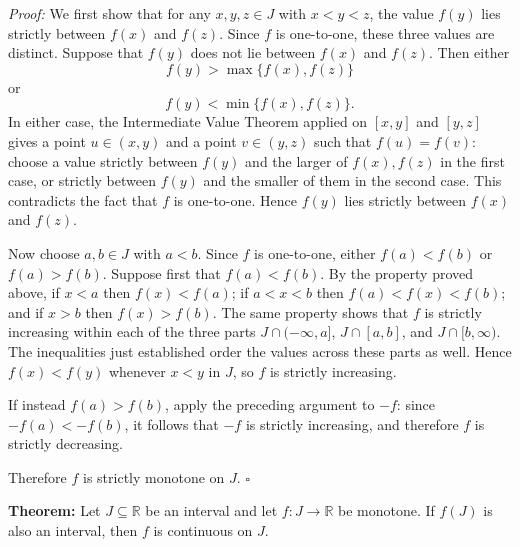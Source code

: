 \documentclass[a4paper,11pt,abstracton]{scrartcl}
\newcommand{\RR}{\mathbb{R}}
\theoremstyle{dotlessP}
\theoremstyle{dotlessS}
\theoremstyle{remark}
\theoremstyle{definition}
\begin{document}
\begin{claim_box}
\textit{Proof:}
We first show that for any $x,y,z\in J$ with $x<y<z$, the value $f(y)$ lies strictly between $f(x)$ and $f(z)$. Since $f$ is one-to-one, these three values are distinct. Suppose that $f(y)$ does not lie between $f(x)$ and $f(z)$. Then either
\[
    f(y)>\max\{f(x),f(z)\}
\]
or
\[
    f(y)<\min\{f(x),f(z)\}.
\]
In either case, the Intermediate Value Theorem applied on $[x,y]$ and $[y,z]$ gives a point $u\in(x,y)$ and a point $v\in(y,z)$ such that $f(u)=f(v)$: choose a value strictly between $f(y)$ and the larger of $f(x),f(z)$ in the first case, or strictly between $f(y)$ and the smaller of them in the second case. This contradicts the fact that $f$ is one-to-one. Hence $f(y)$ lies strictly between $f(x)$ and $f(z)$.

Now choose $a,b\in J$ with $a<b$. Since $f$ is one-to-one, either $f(a)<f(b)$ or $f(a)>f(b)$. Suppose first that $f(a)<f(b)$. By the property proved above, if $x<a$ then $f(x)<f(a)$; if $a<x<b$ then $f(a)<f(x)<f(b)$; and if $x>b$ then $f(x)>f(b)$. The same property shows that $f$ is strictly increasing within each of the three parts $J\cap(-\infty,a]$, $J\cap[a,b]$, and $J\cap[b,\infty)$. The inequalities just established order the values across these parts as well. Hence $f(x)<f(y)$ whenever $x<y$ in $J$, so $f$ is strictly increasing.

If instead $f(a)>f(b)$, apply the preceding argument to $-f$: since $-f(a)<-f(b)$, it follows that $-f$ is strictly increasing, and therefore $f$ is strictly decreasing.

Therefore $f$ is strictly monotone on $J$.
\hfill$\square$
\end{claim_box}

\begin{problem_box}
\textbf{Theorem:}
Let $J\subseteq\RR$ be an interval and let $f:J\to\RR$ be monotone. If $f(J)$ is also an interval, then $f$ is continuous on $J$.
\end{problem_box}
\end{document}

